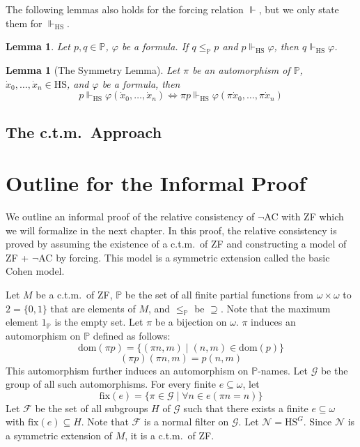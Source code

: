 \documentclass{report}
\newtheorem{lem}[thm]{Lemma}
\begin{document}
The following lemmas also holds for the forcing relation $\Vdash$, but we only state them for $\Vdash_{\mathrm{HS}}$.

\begin{lem}\label{lem:strengthening}
  Let $p, q \in \mathbb{P}$, $\varphi$ be a formula. If $q \leq_{\mathbb{P}} p$ and $p \Vdash_{\mathrm{HS}} \varphi$, then $q \Vdash_{\mathrm{HS}} \varphi$.
\end{lem}

\begin{lem}[The Symmetry Lemma]\label{lem:symmetry_lemma}
  Let $\pi$ be an automorphism of $\mathbb{P}$, $\dot{x}_0, \ldots, \dot{x}_n \in \mathrm{HS}$, and $\varphi$ be a formula, then
  $$p \Vdash_{\mathrm{HS}} \varphi(\dot{x}_0, \ldots, \dot{x}_n) \Leftrightarrow \pi p \Vdash_{\mathrm{HS}} \varphi(\pi \dot{x}_0, \ldots, \pi \dot{x}_n)$$
\end{lem}

\subsection{The c.t.m.\  Approach}\label{subsection:ctm}

\section{Outline for the Informal Proof}\label{sec:outline}
We outline an informal proof of the relative consistency of $\neg$AC with ZF which we will formalize in the next chapter.
In this proof, the relative consistency is proved by assuming the existence of a c.t.m.\  of ZF and constructing a model of ZF + $\neg$AC by forcing. 
This model is a symmetric extension called the basic Cohen model.

Let $M$ be a c.t.m.\  of ZF, $\mathbb{P}$ be the set of all finite partial functions from $\omega \times \omega$ to $2 = \{0, 1\}$
that are elements of $M$, and $\leq_{\mathbb{P}}$ be $\supseteq$.
Note that the maximum element $1_{\mathbb{P}}$ is the empty set. 
Let $\pi$ be a bijection on $\omega$. $\pi$ induces an automorphism on $\mathbb{P}$ defined as follows:
$$\mathrm{dom}(\pi p) = \{ (\pi n, m) \mid (n, m) \in \mathrm{dom}(p) \}$$
$$(\pi p)(\pi n, m) = p(n, m)$$
This automorphism further induces an automorphism on $\mathbb{P}$-names. 
Let $\mathcal{G}$ be the group of all such automorphisms.
For every finite $e \subseteq \omega$, let 
$$\mathrm{fix}(e) = \{ \pi \in \mathcal{G} \mid \forall n \in e (\pi n = n) \}$$
Let $\mathcal{F}$ be the set of all subgroups $H$ of $\mathcal{G}$ such that there exists a finite $e \subseteq \omega$ with $\mathrm{fix}(e) \subseteq H$.
Note that $\mathcal{F}$ is a normal filter on $\mathcal{G}$. Let $\mathcal{N} = \mathrm{HS}^{G}$.
Since $\mathcal{N}$ is a symmetric extension of $M$, it is a c.t.m.\  of ZF. 
\end{document}
